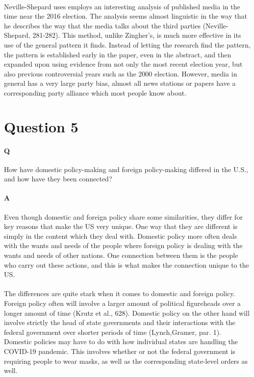 \documentclass[12pt]{article}
\begin{document}
\paragraph{}
Neville-Shepard uses employs an interesting analysis of published
media in the time near the 2016 election. The analysis seems almost
linguistic in the way that he describes the way that the media talks
about the third parties (Neville-Shepard, 281-282). This method,
unlike Zingher's, is much more effective in its use of the general
pattern it finds. Instead of letting the research find the pattern,
the pattern is established early in the paper, even in the abstract,
and then expanded upon using evidence from not only the most recent
election year, but also previous controversial years such as the 2000
election. However, media in general has a very large party bias,
almost all news stations or papers have a corresponding party alliance
which most people know about. 
\section*{Question 5}
\paragraph{Q}
How have domestic policy-making and foreign policy-making differed in the
U.S., and how have they been connected? 
\paragraph{A}
Even though domestic and foreign policy share some similarities, they
differ for key reasons that make the US very unique. One way that they
are different is simply in the content which they deal with. Domestic
policy more often deals with the wants and needs of the people where
foreign policy is dealing with the wants and needs of other
nations. One connection between them is the people who carry out these
actions, and this is what makes the connection unique to the US.
\paragraph{}
The differences are quite stark when it comes to domestic and foreign
policy. Foreign policy often will involve a larger amount of political
figureheads over a longer amount of time (Krutz et al., 628). Domestic
policy on the other hand will involve strictly the head of state
governments and their interactions with the federal government over
shorter periods of time (Lynch,Gramer, par. 1). Domestic policies may
have to do with how individual states are handling the COVID-19
pandemic. This involves whether or not the federal government is
requiring people to wear masks, as well as the corresponding
state-level orders as well.
\end{document}
